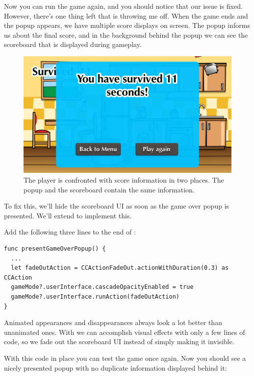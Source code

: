 Now you can run the game again, and you should notice that our issue is fixed.
However, there's one thing left that is throwing me off. When the game ends and
the popup appears, we have multiple score displays on screen. The popup informs
us about the final score, and in the background behind the popup we can see the
scoreboard that is displayed during gameplay.

\begin{figure}[H]
    \centering
    \includegraphics[width=0.75\linewidth]{images/Chapter7/no_ui_fadeout_popup.png}
    \caption{The player is confronted with score information in two places. The
    popup and the scoreboard contain the same information.}
\end{figure}

To fix this, we'll hide the scoreboard UI as soon as the game over popup is
presented. We'll extend  to implement this. 

\begin{leftbar}
Add the following three lines to the end of :
\begin{lstlisting}
func presentGameOverPopup() {
  ...  
  let fadeOutAction = CCActionFadeOut.actionWithDuration(0.3) as CCAction
  gameMode?.userInterface.cascadeOpacityEnabled = true
  gameMode?.userInterface.runAction(fadeOutAction)
}
\end{lstlisting}
\end{leftbar}

Animated appearances and disappearances always look a lot better than unanimated
ones. With \cocos{} we can accomplish visual effects with only a few lines of
code, so we fade out the scoreboard UI instead of simply making it invisible.

With this code in place you can test the game once again. Now you should see a
nicely presented popup with no duplicate information displayed behind it:

